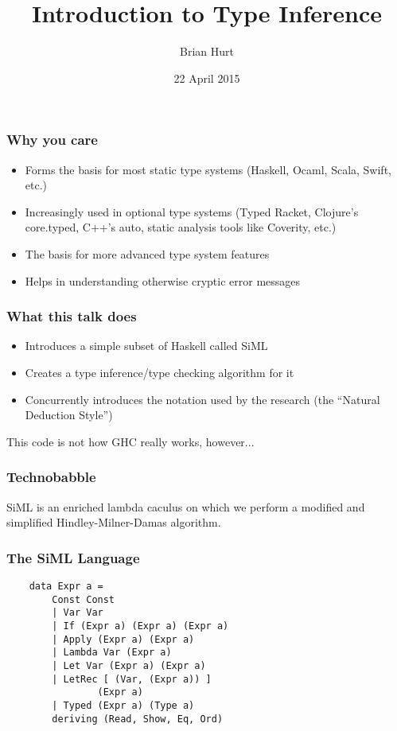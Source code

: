 \documentclass{beamer}
\title{Introduction to Type Inference}
\author{Brian Hurt}
\date{22 April 2015}
\begin{document}
\begin{frame}
    \titlepage
\end{frame}

\begin{frame}
\frametitle{Why you care}
\begin{itemize}
\item Forms the basis for most static type systems (Haskell, Ocaml, Scala, Swift, etc.)
\item Increasingly used in optional type systems (Typed Racket, Clojure's
core.typed, C++'s auto, static analysis tools like Coverity, etc.)
\item The basis for more advanced type system features
\item Helps in understanding otherwise cryptic error messages
\end{itemize}

\end{frame}

\begin{frame}
\frametitle{What this talk does}
\begin{itemize}
\item Introduces a simple subset of Haskell called SiML
\item Creates a type inference/type checking algorithm for it
\item Concurrently introduces the notation used by the research (the
``Natural Deduction Style'')
\end{itemize}

This code is not how GHC really works, however...
\end{frame}

\begin{frame}
\frametitle{Technobabble}
\begin{center}
SiML is an enriched lambda caculus on which we perform a modified and
simplified Hindley-Milner-Damas algorithm.
\end{center}
\end{frame}

\begin{frame}[fragile]
\frametitle{The SiML Language}
{\tt \Large{
\begin{verbatim}
    data Expr a =
        Const Const
        | Var Var
        | If (Expr a) (Expr a) (Expr a)
        | Apply (Expr a) (Expr a)
        | Lambda Var (Expr a)
        | Let Var (Expr a) (Expr a)
        | LetRec [ (Var, (Expr a)) ]
                (Expr a)
        | Typed (Expr a) (Type a)
        deriving (Read, Show, Eq, Ord)
\end{verbatim}
}}
\end{frame}
\end{document}
